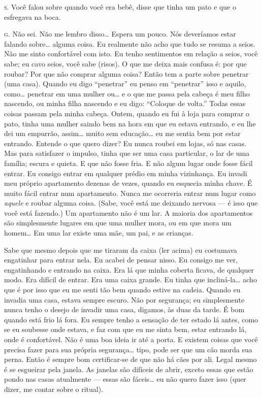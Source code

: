 \noindent\hskip0mm\textsc{s.} Você falou sobre quando você era bebê, disse que tinha um pato e que
o esfregava na boca.

\noindent\hskip0mm\textsc{g.} Não sei. Não me lembro disso\ldots{} Espera um pouco. Nós deveríamos estar
falando sobre\ldots{} alguma coisa. Eu realmente não acho que tudo se
resuma a seios.\idxseios{} Não me sinto confortável com isto. Eu tenho sentimentos
em relação a seios, você sabe; eu cavo seios, você sabe (risos). O que
me deixa mais confusa é: por que roubar? Por que não comprar alguma
coisa? Então tem a parte sobre penetrar (uma casa). Quando eu digo
``penetrar'' eu penso em
``penetrar'' isso e aquilo, como\ldots{} penetrar
em uma mulher ou\ldots{} e o que me passa pela cabeça é meu filho nascendo,
ou minha filha nascendo e eu digo: ``Coloque de
volta.'' Todas essas coisas passam pela minha cabeça.
Ontem, quando eu fui à loja para comprar o pato, tinha uma mulher
saindo bem na hora em que eu estava entrando, e eu lhe dei um empurrão,
assim\ldots{} muito sem educação\ldots{} eu me sentia bem por estar entrando.
Entende o que quero dizer? Eu nunca roubei em lojas, só nas casas. Mas
para satisfazer o impulso, tinha que ser uma casa particular, o lar de
uma família; escura e quieta. E que não fosse fria. E não algum lugar
onde fosse fácil entrar. Eu consigo entrar em qualquer prédio em minha
vizinhança. Eu invadi meu próprio apartamento dezenas de vezes, quando
eu esquecia minha chave. É muito fácil entrar num apartamento. Nunca me
ocorreria entrar num lugar como \textit{aquele} e roubar alguma coisa.
(Sabe, você está me deixando nervosa --- é isso que você está
fazendo.) Um apartamento não é um lar. A maioria dos apartamentos são
simplesmente lugares em que uma mulher mora, ou em que mora um homem\ldots{}
Em uma lar existe uma mãe, um pai, e as crianças.

Sabe que mesmo depois que me tiraram da caixa (ler acima) eu
costumava engatinhar para entrar nela. Eu acabei de pensar nisso. Eu
consigo me ver, engatinhando e entrando na caixa. Era lá que minha
coberta ficava, de qualquer modo. Era difícil de entrar. Era uma caixa
grande. Eu tinha que incliná-la\ldots{} acho que é por isso que eu me senti
tão bem quando estive na cadeia. Quando eu invadia uma casa, estava
sempre escuro. Não por segurança; eu simplesmente nunca tenho o desejo
de invadir uma casa, digamos, às duas da tarde. É bom quando está frio
lá fora. Eu sempre tenho a sensação de ter estado lá antes, como se eu
soubesse onde estava, e faz com que eu me sinta bem, estar entrando lá,
onde é confortável. Não é uma boa ideia ir até a porta. E existem
coisas que você precisa fazer para sua própria segurança\ldots{} tipo, pode
ser que um cão morda sua perna. Então é sempre bom certificar-se de que
não há cães por ali. Legal mesmo é se esgueirar pela janela. As janelas
são difíceis de abrir, exceto essas que estão pondo nas casas
atualmente --- essas são fáceis\ldots{} eu não quero fazer isso (quer
dizer, me contar sobre o ritual).

